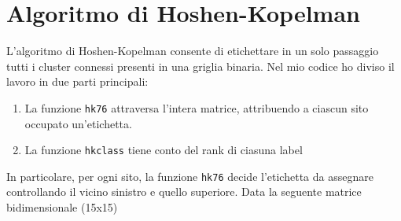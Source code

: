 \section{Algoritmo di Hoshen-Kopelman}
L’algoritmo di Hoshen-Kopelman consente di etichettare in un solo passaggio tutti i cluster connessi presenti in una griglia binaria. Nel mio codice ho diviso il lavoro in due parti principali:
\begin{enumerate}
	\item La funzione \texttt{hk76} attraversa l’intera matrice, attribuendo a ciascun sito occupato un’etichetta.
	\item La funzione \texttt{hkclass} tiene conto del rank di ciasuna label
\end{enumerate} 
In particolare, per ogni sito, la funzione \texttt{hk76} decide l’etichetta da assegnare controllando il vicino sinistro e quello superiore. Data la seguente matrice bidimensionale (15x15)
